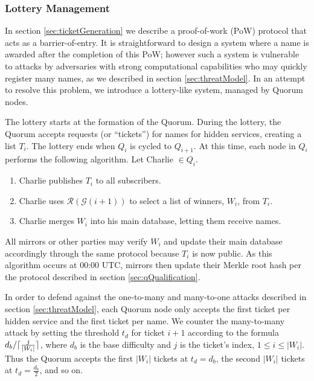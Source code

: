 \documentclass[USenglish,oneside,twocolumn]{article}
\DeclarePairedDelimiter{\ceil}{\lceil}{\rceil}
\newcommand*\nWinners{\left\vert{W_{i}}\right\vert}
\begin{document}
\subsubsection{Lottery Management}
\label{sec:lotteryManagement}

In section \ref{sec:ticketGeneration} we describe a proof-of-work (PoW) protocol that acts as a barrier-of-entry. It is straightforward to design a system where a name is awarded after the completion of this PoW; however such a system is vulnerable to attacks by adversaries with strong computational capabilities who may quickly register many names, as we described in section \ref{sec:threatModel}. In an attempt to resolve this problem, we introduce a lottery-like system, managed by Quorum nodes.

The lottery starts at the formation of the Quorum. During the lottery, the Quorum accepts requests (or ``tickets'') for names for hidden services, creating a list $ T_{i} $. The lottery ends when $ Q_{i} $ is cycled to $ Q_{i + 1} $. At this time, each node in $ Q_{i} $ performs the following algorithm. Let Charlie $ \in Q_{i} $.

\begin{enumerate}
	\item Charlie publishes $ T_{i} $ to all subscribers.
	\item Charlie uses $ \mathcal{R}(\mathcal{G}(i + 1)) $ to select a list of winners, $ W_{i} $, from $ T_{i} $. 
	\item Charlie merges $ W_{i} $ into his main database, letting them receive names.
\end{enumerate}

All mirrors or other parties may verify $ W_{i} $ and update their main database accordingly through the same protocol because $ T_{i} $ is now public. As this algorithm occurs at 00:00 UTC, mirrors then update their Merkle root hash per the protocol described in section \ref{sec:qQualification}.

In order to defend against the one-to-many and many-to-one attacks described in section \ref{sec:threatModel}, each Quorum node only accepts the first ticket per hidden service and the first ticket per name. We counter the many-to-many attack by setting the threshold $ t_{d} $ for ticket $ i + 1 $ according to the formula $ d_{b} / \ceil{\frac{j}{\nWinners}} $, where $ d_{b} $ is the base difficulty and $ j $ is the ticket's index, $ 1 \leq i \leq \nWinners $. Thus the Quorum accepts the first $ \nWinners $ tickets at $ t_{d} = d_{b} $, the second $ \nWinners $ tickets at $ t_{d} = \frac{d_{b}}{2} $, and so on.
\end{document}
